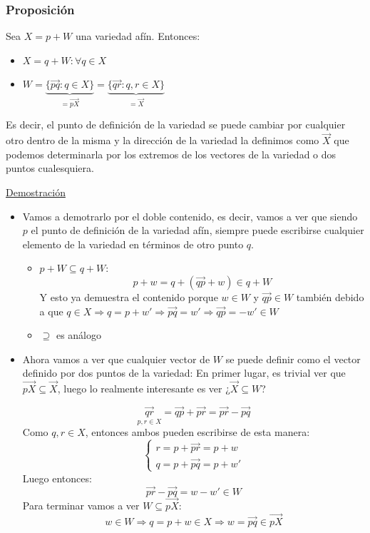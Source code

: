 \documentclass[10pt,a4paper,openright]{book}
\theoremstyle{break}
\begin{document}
\subsubsection*{Proposición}
Sea $X=p+W$ una variedad afín. Entonces:
\begin{itemize}

\item $X = q + W : \forall q \in X$

\item $W = \underbrace{\{ \vec{pq} : q \in X\}}_{= \vec{pX}} = \underbrace{\{\vec{qr} : q,r \in X\}}_{= \vec{X}}$
\end{itemize}
Es decir, el punto de definición de la variedad se puede cambiar por cualquier otro dentro de la misma y la dirección de la variedad la definimos como $\vec{X}$ que podemos determinarla por los extremos de los vectores de la variedad o dos puntos cualesquiera.

\underline{Demostración}
\begin{itemize}
\item Vamos a demotrarlo por el doble contenido, es decir, vamos a ver que siendo $p$ el punto de definición de la variedad afín, siempre puede escribirse cualquier elemento de la variedad en términos de otro punto $q$.
	\begin{itemize}
	\item $p+W \subseteq q+ W$:
$$p + w = q + (\vec{qp} + w) \in q + W $$
	Y esto ya demuestra el contenido porque $w\in W$ y $\vec{qp} \in W$ también debido a que $q \in X \Rightarrow q = p + w' \Rightarrow \vec{pq} = w' \Rightarrow \vec{qp} = -w' \in W$

	\item $\supseteq$ es análogo

	\end{itemize}


\item Ahora vamos a ver que cualquier vector de $W$ se puede definir como el vector definido por dos puntos de la variedad:
En primer lugar, es trivial ver que $\vec{pX} \subseteq \vec{X}$, luego lo realmente interesante es ver ¿$\vec{X} \subseteq W$?

$$\underset{p,r \in X}{\vec{qr}} = \vec{qp} + \vec{pr} = \vec{pr} - \vec{pq}$$
Como $q,r\in X$, entonces ambos pueden escribirse de esta manera:
$$\begin{cases} r = p + \vec{pr} = p+ w \\ q = p + \vec{pq} = p+w' \end{cases}$$
Luego entonces:
$$\vec{pr} - \vec{pq} = w-w'\in W$$
Para terminar vamos a ver $W \subseteq \vec{pX}$:
$$w \in W \Rightarrow q = p + w \in X \Rightarrow w = \vec{pq} \in \vec{pX}$$

\end{itemize}
\end{document}
